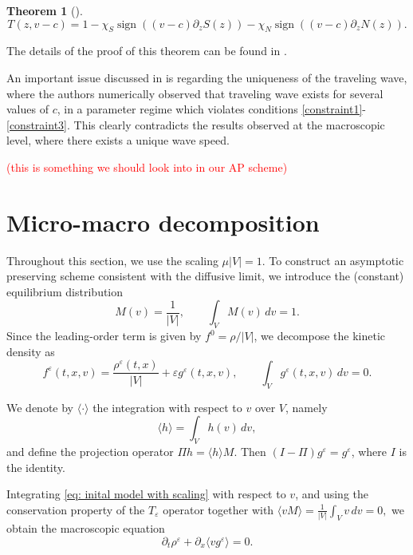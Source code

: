 \documentclass[11pt,twoside]{article}
\numberwithin{equation}{section}
\DeclareMathOperator{\sign}{sign}
\theoremstyle{plain}
\newtheorem{theorem}{Theorem}[section]
\theoremstyle{nonumberplain}
\begin{document}
{\begin{theorem}[\cite{calvez2019chemotactic}]
\[
    T(z, v-c) = 1 - \chi_S \sign((v-c)\partial_zS(z)) - \chi_N \sign((v-c)\partial_zN(z)) .
\]

\end{theorem}
The details of the proof of this theorem can be found in \cite{calvez2019chemotactic}.

\noindent An important issue discussed in \cite{calvez2018well} is regarding the uniqueness of the traveling wave, where the authors numerically observed that traveling wave exists for several values of $c$, in a parameter regime which violates conditions \eqref{constraint1}-\eqref{constraint3}. This clearly contradicts the results observed at the macroscopic level, where there exists a unique wave speed.  

\textcolor{red}{(this is something we should look into in our AP scheme)}
\fi

{
\section{Micro-macro decomposition}
\label{sec: micro macro decomp}

Throughout this section, we use the scaling $\mu |V|=1$. 
To construct an asymptotic preserving scheme consistent with the diffusive limit, we introduce the (constant) equilibrium distribution 
\[
M(v)=\frac1{|V|},
\qquad \int_V M(v)\,dv=1.
\]
Since the leading-order term is given by \(f^0=\rho/|V|\), we decompose the kinetic density as
\begin{equation}\label{f_expansion}
f^\varepsilon(t,x,v)=\frac{\rho^\varepsilon(t,x)}{|V|}+\varepsilon g^\varepsilon(t,x,v),
\qquad
\int_V g^\varepsilon(t,x,v)\,dv=0.
\end{equation}


We denote by \(\langle \cdot \rangle\) the integration with respect to \(v\) over \(V\), namely
\[
\langle h\rangle = \int_V h(v)\,dv,
\]
and define the projection operator
$
\Pi h = \langle h\rangle M.
$ Then \((I-\Pi)g^\varepsilon=g^\varepsilon\), where $I$ is the identity.

Integrating \eqref{eq: inital model with scaling} with respect to \(v\), and using the conservation property of the $T_\varepsilon$ operator together with
$
\langle vM\rangle = \frac1{|V|}\int_V v\,dv = 0,
$
we obtain the macroscopic equation
\[
\partial_t \rho^\varepsilon + \partial_x \langle v g^\varepsilon\rangle = 0.
\]

}}
\end{document}
